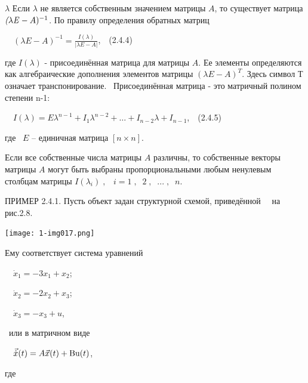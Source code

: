 $ \lambda  $
		Если  $\lambda $ не является собственным значением матрицы  $A$, то существует матрица$\textit(\mathit{\lambda  E}-A)^{-1}$. По
		правилу определения обратных матриц



		\ \  $(\mathit{\lambda  E}-A)^{-1}=\frac{I(\lambda )}{|\mathit{\lambda  E}-A|}$,\ \ (2.4.4)



		где  $I(\lambda )$\textrm{ - }присоединённая матрица для матрицы  $A$. Ее элементы определяются как алгебраические дополнения
		элементов матрицы  $(\mathit{\lambda  E}-A)^T$. Здесь символ Т означает транспонирование. \ Присоединённая матрица - это
		матричный полином степени {n}-1:



		\ \  $I(\lambda )=\mathit{E\lambda }^{n-1}+I_1\lambda ^{n-2}+\ldots +I_{n-2}\lambda +I_{n-1}$,\ \ (2.4.5)



		где \  $E$\textit{ }– единичная матрица  $\left[n\times n\right]$.



		Если все собственные числа матрицы  $A$ различны, то собственные векторы матрицы  $A$ могут быть выбраны
		пропорциональными любым ненулевым столбцам матрицы  $I(\lambda _i)\;,\;\;\;i=1\;,\;\;2\;,\;\;...\;,\;\;n$.



\bigskip


		ПРИМЕР 2.4.1. Пусть объект задан структурной схемой, приведённой \ \ на рис.2.8.



\bigskip

\texttt{[image: 1-img017.png]} 


		Ему соответствует система уравнений



		\ \  $\dot x_1=-3x_1+x_2$;



		\ \  $\dot x_2=-2x_2+x_3$;



		\ \  $\dot x_3=-x_3+u$,



		\ или в матричном виде 



		\ \  $\vec{\dot x}(t)=A\vec x(t)+\normalsubformula{\text{Bu}}(t)$,\ \ 



		где



